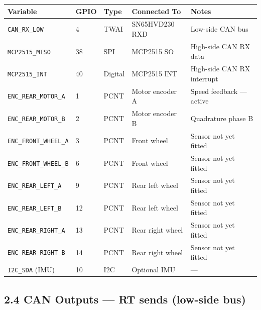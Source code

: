 \documentclass[12pt,a4paper,oneside]{report}
\begin{document}
\begin{longtable}[]{@{}lllll@{}}
\toprule\noalign{}
Variable & GPIO & Type & Connected To & Notes \\
\midrule\noalign{}
\endhead
\bottomrule\noalign{}
\endlastfoot
\texttt{CAN\_RX\_LOW} & 4 & TWAI & SN65HVD230 RXD & Low-side CAN bus \\
\texttt{MCP2515\_MISO} & 38 & SPI & MCP2515 SO & High-side CAN RX data \\
\texttt{MCP2515\_INT} & 40 & Digital & MCP2515 INT & High-side CAN RX
interrupt \\
\texttt{ENC\_REAR\_MOTOR\_A} & 1 & PCNT & Motor encoder A & Speed feedback ---
active \\
\texttt{ENC\_REAR\_MOTOR\_B} & 2 & PCNT & Motor encoder B & Quadrature phase
B \\
\texttt{ENC\_FRONT\_WHEEL\_A} & 3 & PCNT & Front wheel & Sensor not yet
fitted \\
\texttt{ENC\_FRONT\_WHEEL\_B} & 6 & PCNT & Front wheel & Sensor not yet
fitted \\
\texttt{ENC\_REAR\_LEFT\_A} & 9 & PCNT & Rear left wheel & Sensor not yet
fitted \\
\texttt{ENC\_REAR\_LEFT\_B} & 12 & PCNT & Rear left wheel & Sensor not yet
fitted \\
\texttt{ENC\_REAR\_RIGHT\_A} & 13 & PCNT & Rear right wheel & Sensor not yet
fitted \\
\texttt{ENC\_REAR\_RIGHT\_B} & 14 & PCNT & Rear right wheel & Sensor not yet
fitted \\
\texttt{I2C\_SDA} (IMU) & 10 & I2C & Optional IMU & --- \\
\end{longtable}

\subsection{2.4 CAN Outputs --- RT sends (low-side
bus)}\label{can-outputs-rt-sends-low-side-bus}
\end{document}
